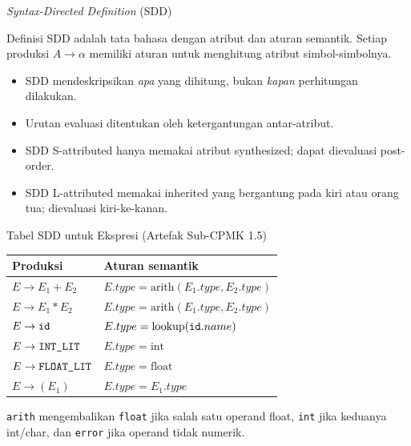 \documentclass[aspectratio=169,10pt,t]{beamer}
\begin{document}
\begin{frame}{\textit{Syntax-Directed Definition} (SDD)}
  \begin{block}{Definisi}
    \small
    SDD adalah tata bahasa dengan atribut dan aturan semantik. Setiap
    produksi \(A \to \alpha\) memiliki aturan untuk menghitung atribut
    simbol-simbolnya.
  \end{block}

  \begin{itemize}
    \item SDD mendeskripsikan \emph{apa} yang dihitung, bukan
          \emph{kapan} perhitungan dilakukan.
    \item Urutan evaluasi ditentukan oleh ketergantungan antar-atribut.
    \item SDD S-attributed hanya memakai atribut synthesized;
          dapat dievaluasi post-order.
    \item SDD L-attributed memakai inherited yang bergantung pada
          kiri atau orang tua; dievaluasi kiri-ke-kanan.
  \end{itemize}
\end{frame}

\begin{frame}{Tabel SDD untuk Ekspresi (Artefak Sub-CPMK 1.5)}
  \scriptsize
  \setlength{\tabcolsep}{4pt}
  \begin{tabular}{@{}p{4.2cm}p{9.0cm}@{}}
    \toprule
    \textbf{Produksi} & \textbf{Aturan semantik} \\
    \midrule
    \(E \to E_1+E_2\) &
      \(E.type=\text{arith}(E_1.type,E_2.type)\) \\
    \(E \to E_1*E_2\) &
      \(E.type=\text{arith}(E_1.type,E_2.type)\) \\
    \(E \to \texttt{id}\) &
      \(E.type=\text{lookup}(\texttt{id}.name)\) \\
    \(E \to \texttt{INT\_LIT}\) & \(E.type=\text{int}\) \\
    \(E \to \texttt{FLOAT\_LIT}\) & \(E.type=\text{float}\) \\
    \(E \to (E_1)\) & \(E.type=E_1.type\) \\
    \bottomrule
  \end{tabular}

  \vspace{5pt}
  {\scriptsize\color{ubbblue!75}\texttt{arith} mengembalikan
  \texttt{float} jika salah satu operand float, \texttt{int} jika
  keduanya int/char, dan \texttt{error} jika operand tidak numerik.}
\end{frame}
\end{document}
